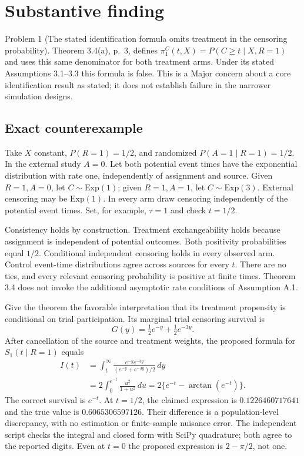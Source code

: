 \documentclass[10pt]{article}
\begin{document}
\section*{Substantive finding}
Problem 1 (The stated identification formula omits treatment in the censoring probability).  Theorem 3.4(a), p. 3, defines \(\pi_1^C(t,X)=P(C\ge t\mid X,R=1)\) and uses this same denominator for both treatment arms. Under its stated Assumptions 3.1–3.3 this formula is false. This is a Major concern about a core identification result as stated; it does not establish failure in the narrower simulation designs.\par
\subsection*{Exact counterexample}
Take \(X\) constant, \(P(R=1)=1/2\), and randomized \(P(A=1\mid R=1)=1/2\). In the external study \(A=0\). Let both potential event times have the exponential distribution with rate one, independently of assignment and source. Given \(R=1,A=0\), let \(C\sim\mathrm{Exp}(1)\); given \(R=1,A=1\), let \(C\sim\mathrm{Exp}(3)\). External censoring may be \(\mathrm{Exp}(1)\). In every arm draw censoring independently of the potential event times. Set, for example, \(\tau=1\) and check \(t=1/2\).\par
Consistency holds by construction. Treatment exchangeability holds because assignment is independent of potential outcomes. Both positivity probabilities equal \(1/2\). Conditional independent censoring holds in every observed arm. Control event-time distributions agree across sources for every \(t\). There are no ties, and every relevant censoring probability is positive at finite times. Theorem 3.4 does not invoke the additional asymptotic rate conditions of Assumption A.1.\par
Give the theorem the favorable interpretation that its treatment propensity is conditional on trial participation. Its marginal trial censoring survival is \[G(y)=\tfrac12e^{-y}+\tfrac12e^{-3y}.\] After cancellation of the source and treatment weights, the proposed formula for \(S_1(t\mid R=1)\) equals \[\begin{aligned}
I(t)&=\int_t^\infty\frac{e^{-y}e^{-3y}}{(e^{-y}+e^{-3y})/2}\,dy\\
&=2\int_0^{e^{-t}}\frac{u^2}{1+u^2}\,du
=2\{e^{-t}-\arctan(e^{-t})\}.\end{aligned}\] The correct survival is \(e^{-t}\). At \(t=1/2\), the claimed expression is \(0.1226460717641\) and the true value is \(0.6065306597126\). Their difference is a population-level discrepancy, with no estimation or finite-sample nuisance error. The independent script checks the integral and closed form with SciPy quadrature; both agree to the reported digits. Even at \(t=0\) the proposed expression is \(2-\pi/2\), not one.\par
\end{document}
